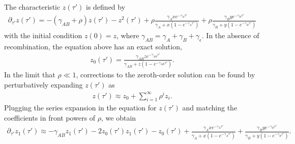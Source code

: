 \documentclass[11pt]{article}
\begin{document}
The characteristic $z(\tau')$ is defined by 
\begin{align}\label{eq:z_general_eq}
    \partial_{\tau'} z(\tau') = -(\gamma_{AB} + \rho) z(\tau') - z^2(\tau') + \rho \frac{\gamma_Axe^{-\gamma_A\tau'}}{\gamma_A+x(1-e^{-\gamma_A\tau'})} + \rho \frac{\gamma_Bye^{-\gamma_B\tau'}}{\gamma_B+y(1-e^{-\gamma_B\tau'})}
\end{align}
with the initial condition $z(0)=z$, where $\gamma_{AB} = \gamma_A + \gamma_B + \gamma_{\epsilon}$. In the absence of recombination, the equation above has an exact solution, 
\begin{align}
    z_0(\tau') = \frac{\gamma_{AB}ze^{-\gamma_{AB}\tau'}}{\gamma_{AB}+z(1-e^{-\gamma_{AB}\tau'})}.
\end{align}
In the limit that $\rho \ll 1$, corrections to the zeroth-order solution can be found by perturbatively expanding $z(\tau')$ as
\begin{align}\label{eq:z_series}
    z(\tau') \approx z_0 + \sum_{i=1}^{\infty} \rho^{i}z_i.
\end{align}
Plugging the series expansion in the equation for $z(\tau')$ and matching the coefficients in front powers of $\rho$, we obtain 
\begin{align}
        \partial_{\tau'}z_1(\tau') \approx -\gamma_{AB}z_1(\tau') -2z_0(\tau')z_1(\tau') - z_0(\tau') + \frac{\gamma_Axe^{-\gamma_A\tau'}}{\gamma_A+x(1-e^{-\gamma_A\tau'})} + \frac{\gamma_Bye^{-\gamma_B\tau'}}{\gamma_B+y(1-e^{-\gamma_B\tau'})}.
\end{align}
\end{document}
